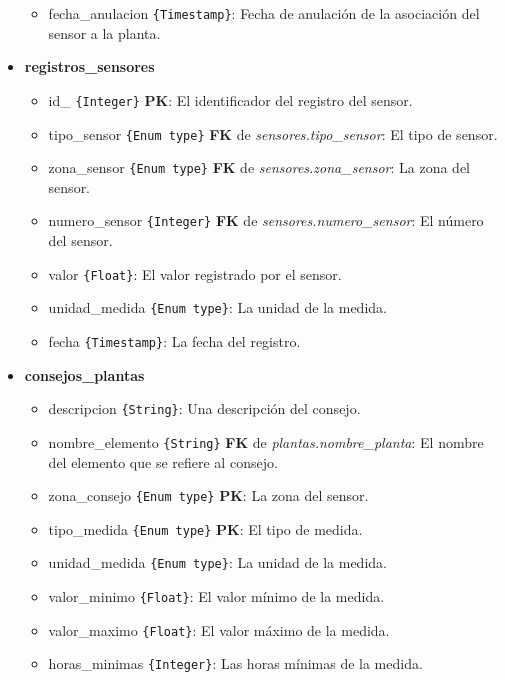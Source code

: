\begin{itemize}
\begin{itemize}
                \item fecha\_anulacion \texttt{\{Timestamp\}}: Fecha de anulación de la asociación del sensor a la planta.
            \end{itemize}
            \item \textbf{registros\_sensores}
            \begin{itemize}
                \item id\_ \texttt{\{Integer\}} \textbf{PK}: El identificador del registro del sensor.
                \item tipo\_sensor \texttt{\{Enum type\}} \textbf{FK} de \textit{sensores.tipo\_sensor}: El tipo de sensor.
                \item zona\_sensor \texttt{\{Enum type\}} \textbf{FK} de \textit{sensores.zona\_sensor}: La zona del sensor.
                \item numero\_sensor \texttt{\{Integer\}} \textbf{FK} de \textit{sensores.numero\_sensor}: El número del sensor.
                \item valor \texttt{\{Float\}}: El valor registrado por el sensor.
                \item unidad\_medida \texttt{\{Enum type\}}: La unidad de la medida.
                \item fecha \texttt{\{Timestamp\}}: La fecha del registro.
            \end{itemize}
            \item \textbf{consejos\_plantas}
            \begin{itemize}
                \item descripcion \texttt{\{String\}}: Una descripción del consejo.
                \item nombre\_elemento \texttt{\{String\}} \textbf{FK} de \textit{ plantas.nombre\_planta}: El nombre del elemento que se refiere al consejo.
                \item zona\_consejo \texttt{\{Enum type\}} \textbf{PK}: La zona del sensor.
                \item tipo\_medida \texttt{\{Enum type\}} \textbf{PK}: El tipo de medida.
                \item unidad\_medida \texttt{\{Enum type\}}: La unidad de la medida.
                \item valor\_minimo \texttt{\{Float\}}: El valor mínimo de la medida.
                \item valor\_maximo \texttt{\{Float\}}: El valor máximo de la medida.
                \item horas\_minimas \texttt{\{Integer\}}: Las horas mínimas de la medida.

\end{itemize}
\end{itemize}
